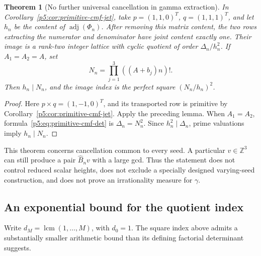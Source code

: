 \documentclass[11pt,a4paper]{article}
\newtheorem{theorem}{Theorem}[section]
\theoremstyle{definition}
\theoremstyle{remark}
\numberwithin{equation}{section}
\begin{document}
\begin{theorem}[No further universal cancellation in gamma extraction]
\label{p5:thm:cmf-universal-content}
In Corollary~\ref{p5:cor:primitive-cmf-jet}, take
$p=(1,1,0)^T$, $q=(1,1,1)^T$, and let $h_n$ be the content of
$\operatorname{adj}(\Phi_n)$. After removing this matrix content,
the two rows extracting the numerator and denominator have joint
content exactly one. Their image is a rank-two integer lattice with
cyclic quotient of order $\Delta_n/h_n^2$.
If $A_1=A_2=A$, set
\[
 N_n=\prod_{j=1}^3((A+b_j)n)!.
\]
Then $h_n\mid N_n$, and the image index is the perfect square
$(N_n/h_n)^2$.
\end{theorem}
\begin{proof}
Here $p\times q=(1,-1,0)^T$, and its transported row is primitive by
Corollary~\ref{p5:cor:primitive-cmf-jet}. Apply the preceding lemma.
When $A_1=A_2$, formula~\eqref{p5:eq:primitive-cmf-det} is
$\Delta_n=N_n^2$. Since $h_n^2\mid\Delta_n$, prime valuations imply
$h_n\mid N_n$.
\end{proof}

This theorem concerns cancellation common to every seed. A particular
$v\in\mathbb Z^3$ can still produce a pair $\widehat B_nv$ with a
large gcd. Thus the statement does not control reduced scalar heights,
does not exclude a specially designed varying-seed construction, and
does not prove an irrationality measure for $\gamma$.

\subsection{An exponential bound for the quotient index}

Write $d_M=\operatorname{lcm}(1,\ldots,M)$, with $d_0=1$.
The square index above admits a substantially smaller arithmetic bound
than its defining factorial determinant suggests.
\end{document}
